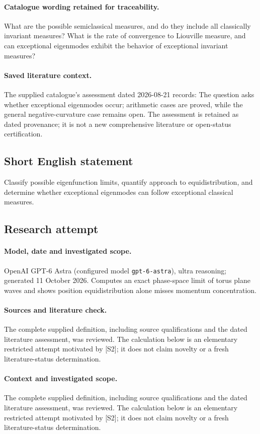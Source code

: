 \documentclass[11pt]{article}
\begin{document}
\paragraph{Catalogue wording retained for traceability.}
What are the possible semiclassical measures, and do they include all classically invariant measures? What is the rate of convergence to Liouville measure, and can exceptional eigenmodes exhibit the behavior of exceptional invariant measures?

\paragraph{Saved literature context.} The supplied catalogue's assessment dated 2026-08-21 records: The question asks whether exceptional eigenmodes occur; arithmetic cases are proved, while the general negative-curvature case remains open. The assessment is retained as dated provenance; it is not a new comprehensive literature or open-status certification.
\subsection{Short English statement}
Classify possible eigenfunction limits, quantify approach to equidistribution, and determine whether exceptional eigenmodes can follow exceptional classical measures.
\subsection{Research attempt}
\paragraph{Model, date and investigated scope.}
OpenAI GPT-6 Astra (configured model \texttt{gpt-6-astra}), ultra reasoning; generated 11 October 2026. Computes an exact phase-space limit of torus plane waves and shows position equidistribution alone misses momentum concentration.

\paragraph{Sources and literature check.}
The complete supplied definition, including source qualifications and the dated literature assessment, was reviewed. The calculation below is an elementary restricted attempt motivated by [S2]; it does not claim novelty or a fresh literature-status determination.

\paragraph{Context and investigated scope.} The complete supplied definition, including source qualifications and the dated literature assessment, was reviewed. The calculation below is an elementary restricted attempt motivated by [S2]; it does not claim novelty or a fresh literature-status determination.
\end{document}
